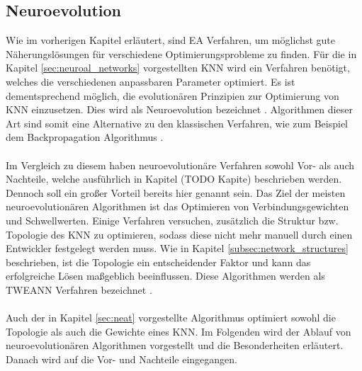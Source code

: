 \subsection{Neuroevolution}
\label{subsec:neuroevolution}
Wie im vorherigen Kapitel erläutert, sind \ac{EA} Verfahren, um möglichst gute Näherungslösungen für verschiedene Optimierungsprobleme zu finden. Für die in Kapitel \ref{sec:neuroal_networks} vorgestellten \ac{KNN} wird ein Verfahren benötigt, welches die verschiedenen anpassbaren Parameter optimiert. Es ist dementsprechend möglich, die evolutionären Prinzipien zur Optimierung von \ac{KNN} einzusetzen. Dies wird als Neuroevolution bezeichnet \cite{meisner2009neurostrategies}. Algorithmen dieser Art sind somit eine Alternative zu den klassischen Verfahren, wie zum Beispiel dem Backpropagation Algorithmus \cite{whitley1993genetic}. 
\\\\
Im Vergleich zu diesem haben neuroevolutionäre Verfahren sowohl Vor- als auch Nachteile, welche ausführlich in Kapitel (TODO Kapite) beschrieben werden. Dennoch soll ein großer Vorteil bereits hier genannt sein. Das Ziel der meisten neuroevolutionären Algorithmen ist das Optimieren von Verbindungsgewichten und Schwellwerten. Einige Verfahren versuchen, zusätzlich die Struktur bzw. Topologie des \ac{KNN} zu optimieren, sodass diese nicht mehr manuell durch einen Entwickler festgelegt werden muss. Wie in Kapitel \ref{subsec:network_structures} beschrieben, ist die Topologie ein entscheidender Faktor und kann das erfolgreiche Lösen maßgeblich beeinflussen. Diese Algorithmen werden als \ac{TWEANN} Verfahren bezeichnet \cite{stanley2002evolving}. 
\\\\
Auch der in Kapitel \ref{sec:neat} vorgestellte Algorithmus optimiert sowohl die Topologie als auch die Gewichte eines \ac{KNN}. Im Folgenden wird der Ablauf von neuroevolutionären Algorithmen vorgestellt und die Besonderheiten erläutert. Danach wird auf die Vor- und Nachteile eingegangen.

